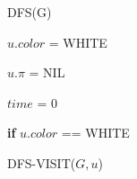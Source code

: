 
\begin{minipage}{.7\linewidth}

    

\begin{algorithm} [H]
\renewcommand{\thealgorithm}{}
\SetAlgoLined

DFS(G)

 {

    $\displaystyle{u.color}$ = WHITE
    
    $\displaystyle{u.\pi}$ = NIL
    
   }
    
 $\displaystyle{time}$ = 0

 {

    \textbf{if} {$\displaystyle{ u.color}$ == WHITE}{
        
        DFS-VISIT($\displaystyle{G,u}$) 
        
         }
         
    }
    
\end{algorithm}


\end{minipage}